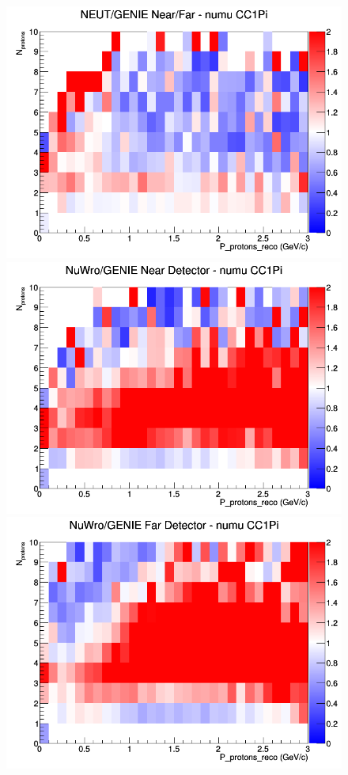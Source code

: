 \documentclass[12pt]{article}
\begin{document}
\begin{figure}[h]
\endminipage
{}
\includegraphics[width=\linewidth]{eff_N_P/FGT/protons/ratios/CC1Pi_NEUT_GENIE_numu_NF_N_P.png}
\endminipage
\newline
{}
\includegraphics[width=\linewidth]{eff_N_P/FGT/protons/ratios/CC1Pi_NuWro_GENIE_numu_near_N_P.png}
\endminipage
{}
\includegraphics[width=\linewidth]{eff_N_P/FGT/protons/ratios/CC1Pi_NuWro_GENIE_numu_far_N_P.png}

\end{figure}
\end{document}
